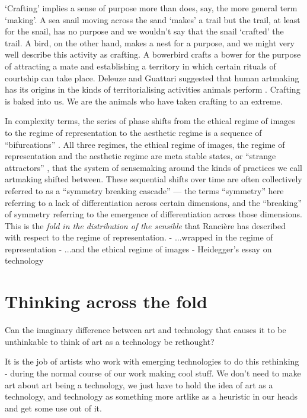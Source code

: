 \documentclass[letterpaper]{article}
\begin{document}
    ‘Crafting’ implies a sense of purpose more than does, say, the more general term ‘making’. A sea snail moving across the sand ‘makes’ a trail but the trail, at least for the snail, has no purpose and we wouldn't say that the snail ‘crafted’ the trail. A bird, on the other hand, makes a nest for a purpose, and we might very well describe this activity as crafting. A bowerbird crafts a bower for the purpose of attracting a mate and establishing a territory in which certain rituals of courtship can take place. Deleuze and Guattari suggested that human artmaking has its origins in the kinds of territorialising activities animals perform \citep[p.15]{GuattariChsmss1995}. Crafting is baked into us. We are the animals who have taken crafting to an extreme.
    
    In complexity terms, the series of phase shifts from the ethical regime of images to the regime of representation to the aesthetic regime is a sequence of “bifurcations” \citep{LandauThryOfPhstrnstns1936}. All three regimes, the ethical regime of images, the regime of representation and the aesthetic regime are meta stable states, or “strange attractors” \citep{RuelleTakensOnThNtrOfTrblnc1971}, that the system of sensemaking around the kinds of practices we call artmaking shifted between. These sequential shifts over time are often collectively referred to as a “symmetry breaking cascade” — the terms “symmetry” here referring to a lack of differentiation across certain dimensions, and the “breaking” of symmetry referring to the emergence of differentiation across those dimensions. This is the \emph{fold in the distribution of the sensible} that Rancière has described with respect to the regime of representation.
    - ...wrapped in the regime of representation
    - ...and the ethical regime of images
    - Heidegger's essay on technology

\section{Thinking across the fold}

    Can the imaginary difference between art and technology that causes it to be unthinkable to think of art as a technology be rethought?
    
    It is the job of artists who work with emerging technologies to do this rethinking - during the normal course of our work making cool stuff. We don't need to make art about art being a technology, we just have to hold the idea of art as a technology, and technology as something more artlike as a heuristic in our heads and get some use out of it.
    
\end{document}
